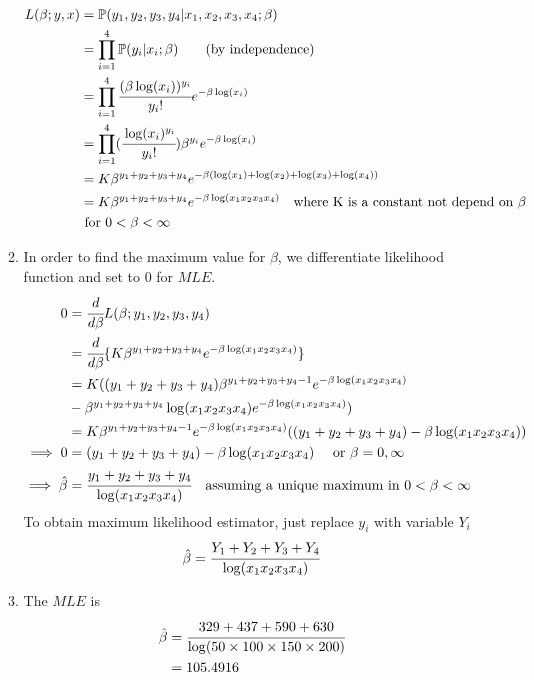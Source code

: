 \documentclass[12pt, oneside, a4paper]{article}
\begin{document}
\begin{enumerate}
\begin{enumerate}[label = (\alph*)]
\begin{align*}
				L(\beta; y,x) & = \mathbb{P}(y_1,y_2,y_3,y_4|x_1,x_2,x_3,x_4;\beta) \\
				& =  \prod_{i = 1}^{4}\mathbb{P}(y_i|x_i ; \beta) \qquad (\text{by independence}) \\
				& = \prod_{i = 1}^{4}\cfrac{(\beta \log(x_i))^{y_i}}{y_i!}e^{-\beta \log(x_i)}\\
				& =  \prod_{i = 1}^{4}(\cfrac{\log(x_i)^{y_i}}{y_i!})\beta^{y_i}e^{-\beta \log(x_i)} \\
				& = K \beta^{y_1 + y_2 + y_3 + y_4}e^{-\beta(\log(x_1) + \log(x_2) + \log(x_3) + \log(x_4))} \\
				& = K \beta^{y_1 + y_2 + y_3 + y_4}e^{-\beta\log(x_1x_2x_3x_4)} \quad \text{where K is a constant not depend on } \beta\\
				& \text{ for } 0<\beta < \infty
			\end{align*}
			\item In order to find the maximum value for $\beta$, we differentiate likelihood function and set to $0$ for $MLE$. 
			\begin{align*}
				0 & = \cfrac{d}{d\beta}L(\beta; y_1,y_2,y_3,y_4)\\
				& = \cfrac{d}{d\beta}\{K \beta^{y_1 + y_2 + y_3 + y_4}e^{-\beta\log(x_1x_2x_3x_4)}\} \\
				& = K((y_1 + y_2 + y_3 + y_4)\beta^{y_1 + y_2 + y_3 + y_4-1}e^{-\beta\log(x_1x_2x_3x_4)}\\
				 & - \beta^{y_1 + y_2 + y_3 + y_4}\log(x_1x_2x_3x_4)e^{-\beta\log(x_1x_2x_3x_4)}) \\
				 & = K\beta^{y_1 + y_2 + y_3 + y_4-1}e^{-\beta\log(x_1x_2x_3x_4)}((y_1 + y_2 + y_3 + y_4)-\beta\log(x_1x_2x_3x_4) )\\
				 \implies 0 & = (y_1 + y_2 + y_3 + y_4)-\beta\log(x_1x_2x_3x_4) \quad \text{ or } \beta = 0, \infty \\
				 \implies \hat{\beta} & = \cfrac{y_1 + y_2 + y_3 + y_4}{\log(x_1x_2x_3x_4)} \quad \text{assuming a unique maximum in } 0< \beta < \infty
			\end{align*}
		To obtain maximum likelihood estimator, just replace $y_i$ with variable $Y_i$\\
		\[\hat{\beta}  = \cfrac{Y_1 + Y_2 + Y_3 + Y_4}{\log(x_1x_2x_3x_4)} \]
			\item The $MLE$ is \begin{align*}
				\hat{\beta} & =  \cfrac{329 + 437 + 590+ 630}{\log(50\times 100 \times 150 \times 200)} \\
				& = 105.4916
			\end{align*}

\end{enumerate}
\end{enumerate}
\end{document}

